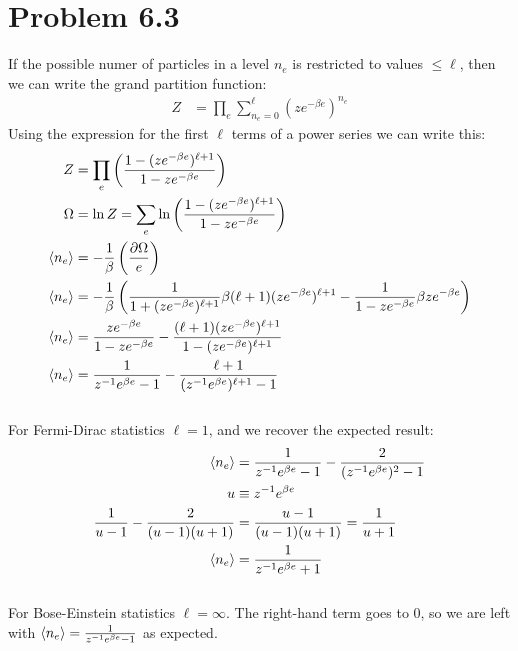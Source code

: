 \documentclass[a4paper,11pt]{article}
\numberwithin{equation}{section}
\begin{document}
\section{Problem 6.3}
If the possible numer of particles in a level $n_e$ is restricted to values $\le \ell$, then we can write the grand partition function:
\begin{align}
 Z &= \prod_e \sum_{n_e=0}^\ell (ze^{-\beta e})^{n_e}
\end{align}
Using the expression for the first $\ell$ terms of a power series we can write this:
\begin{align}
 Z &= \prod_e \left( \frac{1-(ze^{-\beta e})^{\ell+1}}{1-ze^{-\beta e}} \right)\\
 \Omega &= \ln{Z} = \sum_e \ln{\left( \frac{1-(ze^{-\beta e})^{\ell+1}}{1-ze^{-\beta e}} \right)}\\
 \braket{n_e} &= -\frac{1}{\beta}\left(\frac{\partial \Omega}{e} \right)\\
 \braket{n_e} &= -\frac{1}{\beta}\left( \frac{1}{1+(ze^{-\beta e})^{\ell+1}}\beta(\ell+1)(ze^{-\beta e})^{\ell+1} 
		  -\frac{1}{1-ze^{-\beta e}}\beta ze^{-\beta e}\right)\\
 \braket{n_e} &= \frac{ze^{-\beta e}}{1-ze^{-\beta e}}
		  -\frac{(\ell+1)(ze^{-\beta e})^{\ell+1}}{1-(ze^{-\beta e})^{\ell+1}}\\
 \braket{n_e} &= \frac{1}{z^{-1}e^{\beta e}-1}
		  -\frac{\ell+1}{(z^{-1}e^{\beta e})^{\ell+1}-1}\\
\end{align}
\\
For Fermi-Dirac statistics $\ell=1$, and we recover the expected result:
\begin{align}
 \braket{n_e} &= \frac{1}{z^{-1}e^{\beta e}-1}
		  -\frac{2}{(z^{-1}e^{\beta e})^2-1}\\
 u &\equiv z^{-1}e^{\beta e}\\
 \frac{1}{u-1}-\frac{2}{(u-1)(u+1)} &= \frac{u-1}{(u-1)(u+1)} = \frac{1}{u+1}\\
 \braket{n_e} &= \frac{1}{z^{-1}e^{\beta e}+1}
\end{align}
\\
For Bose-Einstein statistics $\ell=\infty$. 
The right-hand term goes to 0, so we are left with $\braket{n_e} = \frac{1}{z^{-1}e^{\beta e}-1} $ as expected.
\end{document}
